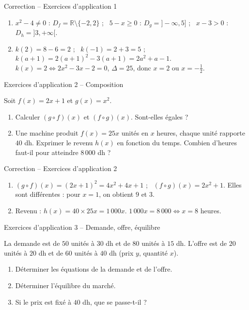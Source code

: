 \documentclass[aspectratio=169,11pt]{beamer}
\newcommand{\R}{\mathbb{R}}
\begin{document}
\begin{frame}{Correction -- Exercices d'application 1}
	\small
	\begin{enumerate}
		\item $x^2-4\neq0$ : $D_f=\R\setminus\{-2,2\}$ ; \ $5-x\ge0$ : $D_g=]-\infty,5]$ ; \ $x-3>0$ : $D_h=]3,+\infty[$.
		\item $k(2)=8-6=2$ ; \ $k(-1)=2+3=5$ ; \ $k(a+1)=2(a+1)^2-3(a+1)=2a^2+a-1$.\\
		$k(x)=2\iff 2x^2-3x-2=0$, $\Delta=25$, donc $x=2$ ou $x=-\tfrac12$.
	\end{enumerate}
\end{frame}

\begin{frame}{Exercices d'application 2 -- Composition}
	\begin{exercicebox}\small
		Soit $f(x)=2x+1$ et $g(x)=x^2$.
		\begin{enumerate}
			\item Calculer $(g\circ f)(x)$ et $(f\circ g)(x)$. Sont-elles égales ?
			\item Une machine produit $f(x)=25x$ unités en $x$ heures, chaque unité rapporte $40$ dh. Exprimer le revenu $h(x)$ en fonction du temps. Combien d'heures faut-il pour atteindre $8\,000$ dh ?
		\end{enumerate}
	\end{exercicebox}
\end{frame}

\begin{frame}{Correction -- Exercices d'application 2}
	\small
	\begin{enumerate}
		\item $(g\circ f)(x)=(2x+1)^2=4x^2+4x+1$ ; \ $(f\circ g)(x)=2x^2+1$. Elles sont différentes : pour $x=1$, on obtient $9$ et $3$.
		\item Revenu : $h(x)=40\times25x=1\,000x$. $1\,000x=8\,000\iff x=8$ heures.
	\end{enumerate}
\end{frame}

\begin{frame}{Exercices d'application 3 -- Demande, offre, équilibre}
	\begin{exercicebox}\small
		La demande est de $50$ unités à $30$ dh et de $80$ unités à $15$ dh. L'offre est de $20$ unités à $20$ dh et de $60$ unités à $40$ dh (prix $y$, quantité $x$).
		\begin{enumerate}
			\item Déterminer les équations de la demande et de l'offre.
			\item Déterminer l'équilibre du marché.
			\item Si le prix est fixé à $40$ dh, que se passe-t-il ?
		\end{enumerate}
	\end{exercicebox}
\end{frame}
\end{document}
